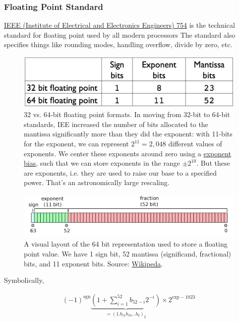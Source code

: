 \documentclass[12pt,letterpaper,twoside]{article}
\begin{document}
\subsubsection{Floating Point Standard}
\href{https://en.wikipedia.org/wiki/IEEE_754}
{IEEE (Institute of Electrical and Electronics Engineers) 754} is the
technical standard for floating point used by all modern processors
The standard also specifies things like rounding modes, handling overflow,
divide by zero, etc. 

\begin{figure}[h]
\centering
\includegraphics[scale=0.4]{fig/float-table.png}
\caption{\footnotesize 32 vs. 64-bit floating point formats.
  In moving from 32-bit to 64-bit standards, IEE
  increased the number of bits allocated to the mantissa significantly
  more than they did the exponent: with 11-bits for the
  exponent, we can represent $2^{11} = 2,048$ different values of
  exponents. We center these exponents around zero using a
  \href{https://en.wikipedia.org/wiki/Exponent_bias}{exponent bias},
  such that we can store exponents in the range $\pm 2^{10}$. But
  these are exponents, i.e. they are used to raise our base to a
  specified power. That's an astronomically
  large rescaling.}
\end{figure}

\begin{figure}[h]
  \centering
  \includegraphics[scale=0.1]{fig/IEEE_754}
  \caption{\footnotesize A visual layout of the 64 bit representation used to store
    a floating point value. We have 1 sign bit, 52 mantissa
(significand, fractional) bits, and 11 exponent bits. Source: \href{https://en.wikipedia.org/wiki/Double-precision_floating-point_format}{Wikipeda}.}
\end{figure}

Symbolically, 

\begin{align*}
  (-1)^{\textrm{sgn}} \underbrace{\left(1 + \sum_{i=1}^{52} b_{52-i} 2^{-i}
  \right)}_{= \left(1.b_{51} b_{50} \ldots b_0\right)_2} \times 2^{\textrm{exp} - 1023}
\end{align*}
\end{document}
